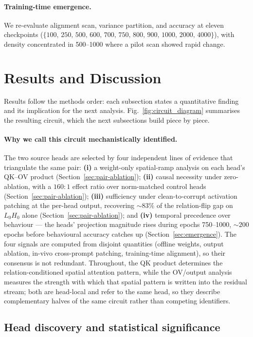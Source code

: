 \documentclass{article}
\begin{document}
\paragraph{Training-time emergence.}
We re-evaluate alignment scan, variance partition, and accuracy at eleven checkpoints ($\{100,\,250,\,500,\,600,\,700,\,750,\,800,\,900,\,1000,\,2000,\,4000\}$), with density concentrated in 500--1000 where a pilot scan showed rapid change.

\section{Results and Discussion}

Results follow the methods order: each subsection states a quantitative finding and its implication for the next analysis. Fig.~\ref{fig:circuit_diagram} summarises the resulting circuit, which the next subsections build piece by piece.

\paragraph{Why we call this circuit mechanistically identified.} The two source heads are selected by four independent lines of evidence that triangulate the same pair: \textbf{(i)} a weight-only spatial-ramp analysis on each head's QK--OV product (Section~\ref{sec:pair-ablation}); \textbf{(ii)} causal necessity under zero-ablation, with a $160{:}1$ effect ratio over norm-matched control heads (Section~\ref{sec:pair-ablation}); \textbf{(iii)} sufficiency under clean-to-corrupt activation patching at the per-head output, recovering $\sim\!83\%$ of the relation-flip gap on $L_0H_0$ alone (Section~\ref{sec:pair-ablation}); and \textbf{(iv)} temporal precedence over behaviour --- the heads' projection magnitude rises during epochs 750--1000, $\sim\!200$ epochs before behavioural accuracy catches up (Section~\ref{sec:emergence}). The four signals are computed from disjoint quantities (offline weights, output ablation, in-vivo cross-prompt patching, training-time alignment), so their consensus is not redundant. Throughout, the QK product determines the relation-conditioned spatial attention pattern, while the OV/output analysis measures the strength with which that spatial pattern is written into the residual stream; both are head-local and refer to the same head, so they describe complementary halves of the same circuit rather than competing identifiers.

\subsection{Head discovery and statistical significance}
\end{document}
